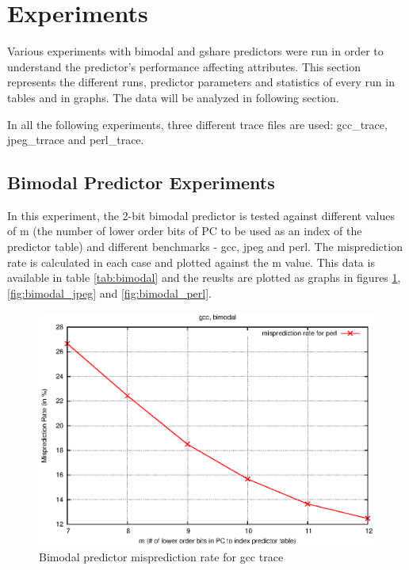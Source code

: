 \section{Experiments}
Various experiments with bimodal and gshare predictors were run in order to understand the predictor's performance affecting attributes. This section represents the different runs, predictor parameters and statistics of every run in tables and in graphs. The data will be analyzed in following section.

In all the following experiments, three different trace files are used: gcc\_trace, jpeg\_trrace and perl\_trace.

\subsection{Bimodal Predictor Experiments}
In this experiment, the 2-bit bimodal predictor is tested against different values of m (the number of lower order bits of PC to be used as an index of the predictor table) and different benchmarks - gcc, jpeg and perl. The misprediction rate is calculated in each case and plotted against the m value. This data is available in table \ref{tab:bimodal} and the reuslts are plotted as graphs in figures \ref{fig:bimodal_gcc}, \ref{fig:bimodal_jpeg} and \ref{fig:bimodal_perl}. 

\begin{figure} [htbp]
    \centering
    \includegraphics[scale=1.32] {image/gcc_bimodal.eps}
    \caption{Bimodal predictor misprediction rate for gcc trace}
    \label{fig:bimodal_gcc}
\end{figure}


